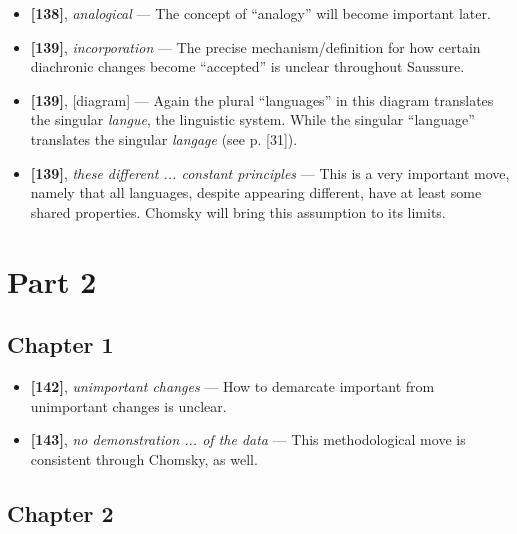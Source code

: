 \documentclass[12pt]{article}
\begin{document}
\begin{itemize}
\item \textbf{[138]}, \textit{analogical} --- The concept of ``analogy'' will become important later.

\item \textbf{[139]}, \textit{incorporation} --- The precise mechanism/definition for how certain diachronic changes become ``accepted'' is unclear throughout Saussure.

\item \textbf{[139]}, [diagram] --- Again the plural ``languages'' in this diagram translates the singular \textit{langue}, the linguistic system. While the singular ``language'' translates the singular \textit{langage} (see p. [31]).

\item \textbf{[139]}, \textit{these different ... constant principles} --- This is a very important move, namely that all languages, despite appearing different, have at least some shared properties. Chomsky will bring this assumption to its limits.

\end{itemize}

\section{Part 2}

\subsection{Chapter 1}

\begin{itemize}

\item \textbf{[142]}, \textit{unimportant changes} --- How to demarcate important from unimportant changes is unclear.

\item \textbf{[143]}, \textit{no demonstration ... of the data} --- This methodological move is consistent through Chomsky, as well.

\end{itemize}

\subsection{Chapter 2}
\end{document}
